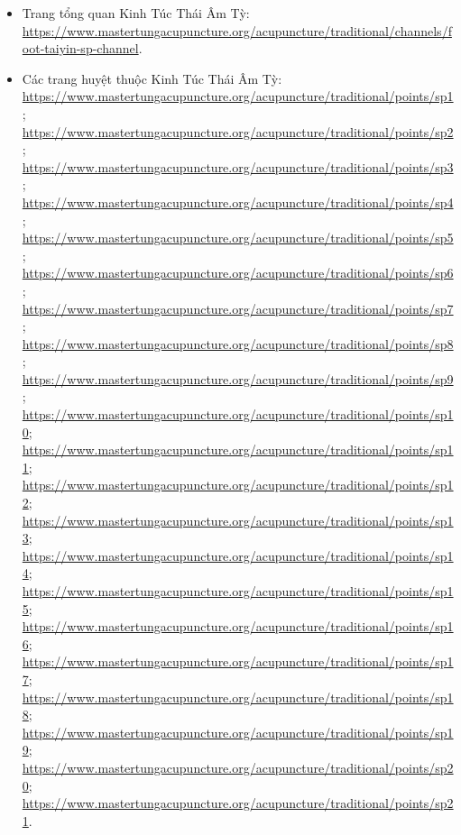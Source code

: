 \documentclass[12pt,a4paper]{article}
\begin{document}
\begin{itemize}
\url{https://www.mastertungacupuncture.org/acupuncture/traditional/points/st38}, \url{https://www.mastertungacupuncture.org/acupuncture/traditional/points/st39}, \url{https://www.mastertungacupuncture.org/acupuncture/traditional/points/st40}, \url{https://www.mastertungacupuncture.org/acupuncture/traditional/points/st41}, \url{https://www.mastertungacupuncture.org/acupuncture/traditional/points/st42}, \url{https://www.mastertungacupuncture.org/acupuncture/traditional/points/st43}, \url{https://www.mastertungacupuncture.org/acupuncture/traditional/points/st44}, \url{https://www.mastertungacupuncture.org/acupuncture/traditional/points/st45}.
  \item Trang tổng quan Kinh Túc Thái Âm Tỳ: \url{https://www.mastertungacupuncture.org/acupuncture/traditional/channels/foot-taiyin-sp-channel}.
  \item Các trang huyệt thuộc Kinh Túc Thái Âm Tỳ: \url{https://www.mastertungacupuncture.org/acupuncture/traditional/points/sp1}; \url{https://www.mastertungacupuncture.org/acupuncture/traditional/points/sp2}; \url{https://www.mastertungacupuncture.org/acupuncture/traditional/points/sp3}; \url{https://www.mastertungacupuncture.org/acupuncture/traditional/points/sp4}; \url{https://www.mastertungacupuncture.org/acupuncture/traditional/points/sp5}; \url{https://www.mastertungacupuncture.org/acupuncture/traditional/points/sp6}; \url{https://www.mastertungacupuncture.org/acupuncture/traditional/points/sp7}; \url{https://www.mastertungacupuncture.org/acupuncture/traditional/points/sp8}; \url{https://www.mastertungacupuncture.org/acupuncture/traditional/points/sp9}; \url{https://www.mastertungacupuncture.org/acupuncture/traditional/points/sp10}; \url{https://www.mastertungacupuncture.org/acupuncture/traditional/points/sp11}; \url{https://www.mastertungacupuncture.org/acupuncture/traditional/points/sp12}; \url{https://www.mastertungacupuncture.org/acupuncture/traditional/points/sp13}; \url{https://www.mastertungacupuncture.org/acupuncture/traditional/points/sp14}; \url{https://www.mastertungacupuncture.org/acupuncture/traditional/points/sp15}; \url{https://www.mastertungacupuncture.org/acupuncture/traditional/points/sp16}; \url{https://www.mastertungacupuncture.org/acupuncture/traditional/points/sp17}; \url{https://www.mastertungacupuncture.org/acupuncture/traditional/points/sp18}; \url{https://www.mastertungacupuncture.org/acupuncture/traditional/points/sp19}; \url{https://www.mastertungacupuncture.org/acupuncture/traditional/points/sp20}; \url{https://www.mastertungacupuncture.org/acupuncture/traditional/points/sp21}.

\end{itemize}
\end{document}
